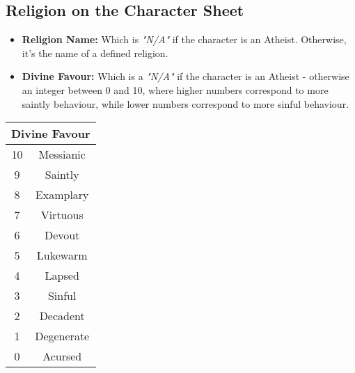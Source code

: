 \subsection{Religion on the Character Sheet}
\begin{itemize}
\item \textbf{Religion Name:} Which is \textit{"N/A"} if the character is an Atheist. Otherwise, it's the name of a defined religion.
\item \textbf{Divine Favour:} Which is a \textit{"N/A"} if the character is an Atheist - otherwise an integer between 0 and 10, where higher numbers correspond to more saintly behaviour, while lower numbers correspond to more sinful behaviour.
\end{itemize}
\begin{tabular}{|c|c|}
\hline
\multicolumn{2}{|c|}{Divine Favour} \\ \hline
10 & Messianic \\ \hline
9 & Saintly \\ \hline
8 & Examplary \\ \hline
7 & Virtuous \\ \hline
6 & Devout \\ \hline
5 & Lukewarm \\ \hline
4 & Lapsed \\ \hline
3 & Sinful \\ \hline
2 & Decadent \\ \hline
1 & Degenerate \\ \hline
0 & Acursed \\ \hline
\end{tabular}
